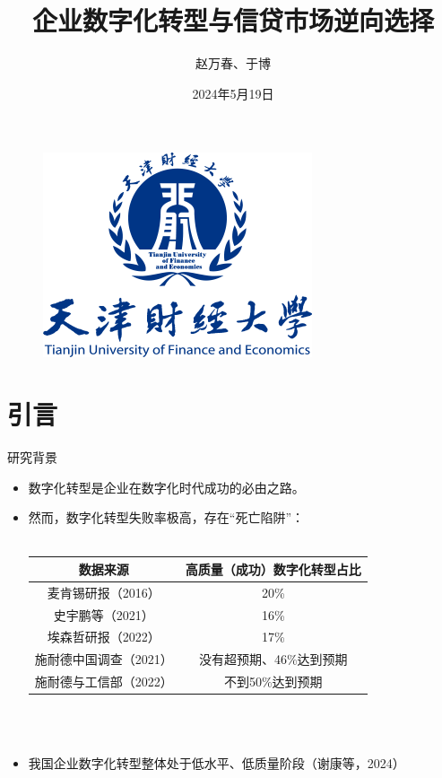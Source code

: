 \documentclass{beamer}
\author{赵万春、于博}
\title{企业数字化转型与信贷市场逆向选择}
\subtitle{}
\institute{天津财经大学 金融学院}
\date{2024年5月19日}
\begin{document}
\kaishu
\begin{frame}
    \titlepage
    \begin{figure}[htpb]
        \begin{center}
            \includegraphics[width=0.2\linewidth]{pic/TJUFE_logo.png}
        \end{center}
    \end{figure}
\end{frame}

\begin{frame}
    \tableofcontents[sectionstyle=show,subsectionstyle=show/shaded/hide,subsubsectionstyle=show/shaded/hide]
\end{frame}


\section{引言}

\begin{frame}{研究背景}
    \begin{itemize}%
        \item 数字化转型是企业在数字化时代成功的必由之路。
        \item 然而，数字化转型失败率极高，存在“死亡陷阱”：
        \\ \hspace*{\fill} \\
        \begin{tabular}{c|c}
        	\hline
			数据来源 & 高质量（成功）数字化转型占比 \\
			\hline
			麦肯锡研报（2016）  & 20\% \\
			史宇鹏等（2021） & 16\% \\
			埃森哲研报（2022） & 17\% \\
			施耐德中国调查（2021） & 没有超预期、46\%达到预期 \\
			施耐德与工信部（2022） & 不到50\%达到预期 \\
			\hline
		\end{tabular}
	    \\ \hspace*{\fill} \\
		\item 我国企业数字化转型整体处于低水平、低质量阶段（谢康等，2024）
    \end{itemize}

\end{frame}
\end{document}
